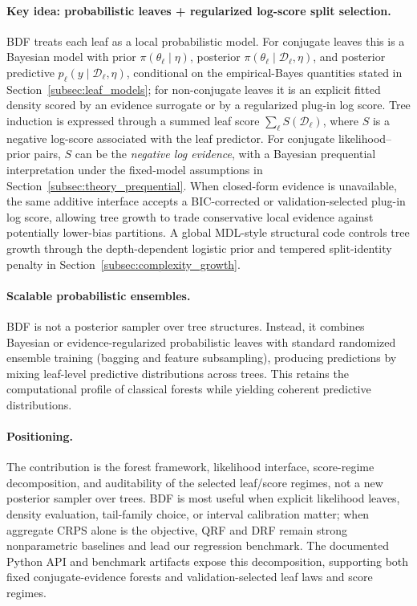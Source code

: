 \documentclass[10pt]{article} %
\begin{document}
\paragraph{Key idea: probabilistic leaves + regularized log-score split selection.}
BDF treats each leaf as a local probabilistic model. For conjugate leaves this is a Bayesian model with prior $\pi(\theta_\ell\mid\eta)$, posterior $\pi(\theta_\ell\mid\mathcal{D}_\ell,\eta)$, and posterior predictive $p_\ell(y\mid \mathcal{D}_\ell,\eta)$, conditional on the empirical-Bayes quantities stated in Section~\ref{subsec:leaf_models}; for non-conjugate leaves it is an explicit fitted density scored by an evidence surrogate or by a regularized plug-in log score.
Tree induction is expressed through a summed leaf score $\sum_{\ell} S(\mathcal{D}_\ell)$, where $S$ is a negative log-score associated with the leaf predictor.
For conjugate likelihood--prior pairs, $S$ can be the \emph{negative log evidence}, with a Bayesian prequential interpretation under the fixed-model assumptions in Section~\ref{subsec:theory_prequential}.
When closed-form evidence is unavailable, the same additive interface accepts a BIC-corrected or validation-selected plug-in log score, allowing tree growth to trade conservative local evidence against potentially lower-bias partitions.
A global MDL-style structural code controls tree growth through the depth-dependent logistic prior and tempered split-identity penalty in Section~\ref{subsec:complexity_growth}.

\paragraph{Scalable probabilistic ensembles.}
BDF is not a posterior sampler over tree structures.
Instead, it combines Bayesian or evidence-regularized probabilistic leaves with standard randomized ensemble training (bagging and feature subsampling), producing predictions by mixing leaf-level predictive distributions across trees.
This retains the computational profile of classical forests while yielding coherent predictive distributions.

\paragraph{Positioning.}
The contribution is the forest framework, likelihood interface, score-regime decomposition, and auditability of the selected leaf/score regimes, not a new posterior sampler over trees.
BDF is most useful when explicit likelihood leaves, density evaluation, tail-family choice, or interval calibration matter; when aggregate CRPS alone is the objective, QRF and DRF remain strong nonparametric baselines and lead our regression benchmark.
The documented Python API and benchmark artifacts expose this decomposition, supporting both fixed conjugate-evidence forests and validation-selected leaf laws and score regimes.
\end{document}
